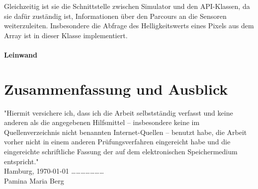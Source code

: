 \documentclass[paper=a4, pagesize, DIV=calc, BCOR=12.5mm, twoside=on, onecolumn=on, open = any, titlepage =on, parskip =half-, headsepline = on, footsepline = on, chapterprefix = on, appendixprefix = off, fontsize = 12pt, numbers = noenddot, abstract = on]{scrbook}
\numberwithin{equation}{chapter}
\theoremstyle{definition}
\theoremstyle{plain}
\theoremstyle{plain}
\theoremstyle{remark}
\theoremstyle{plain}
\theoremstyle{plain}
\begin{document}
Gleichzeitig ist sie die Schnittstelle zwischen Simulator und den API-Klassen, da sie dafür zuständig ist, Informationen über den Parcours an die Sensoren weiterzuleiten. Insbesondere die Abfrage des Helligkeitswerts eines Pixels aus dem Array ist in dieser Klasse implementiert.
\subsubsection{Leinwand}

\newpage
\chapter{Zusammenfassung und Ausblick}

\newpage

\newpage
\thispagestyle{empty}
\vspace*{\fill}
"Hiermit versichere ich, dass ich die Arbeit selbstständig verfasst und keine anderen als die angegebenen Hilfsmittel – insbesondere keine im Quellenverzeichnis nicht benannten Internet-Quellen – benutzt habe, die Arbeit vorher nicht in einem anderen Prüfungsverfahren eingereicht habe und die eingereichte schriftliche Fassung der auf dem elektronischen Speichermedium entspricht."\\

Hamburg, \today \hspace*{\fill} \dots \dots \dots \dots \dots \dots \dots\\
\hspace*{\fill} Pamina Maria Berg $\,$
\end{document}
